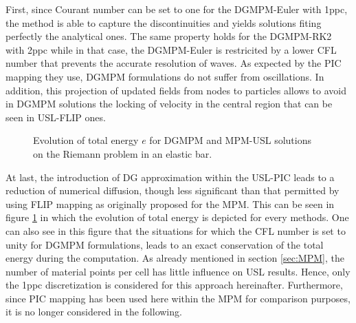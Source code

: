 First, since Courant number can be set to one for the DGMPM-Euler with 1ppc, the method is able to capture the discontinuities and yields solutions fiting perfectly the analytical ones. The same property holds for the DGMPM-RK2 with 2ppc while in that case, the DGMPM-Euler is restricited by a lower CFL number that prevents the accurate resolution of waves. As expected by the PIC mapping they use, DGMPM formulations do not suffer from oscillations. 
In addition, this projection of updated fields from nodes to particles allows to avoid in DGMPM solutions the locking of velocity in the central region that can be seen in USL-FLIP ones.
\begin{figure}[h!]
  \centering
  
  \caption{Evolution of total energy $e$ for DGMPM and MPM-USL solutions on the Riemann problem in an elastic bar.}
  \label{fig:energy_elastic_RP}
\end{figure}
At last, the introduction of DG approximation within the USL-PIC leads to a reduction of numerical diffusion, though less significant than that permitted by using FLIP mapping as originally proposed for the MPM. This can be seen in figure \ref{fig:energy_elastic_RP} in which the evolution of total energy is depicted for every methods.
One can also see in this figure that the situations for which the CFL number is set to unity for DGMPM formulations, leads to an exact conservation of the total energy during the computation.
As already mentioned in section \ref{sec:MPM}, the number of material points per cell has little influence on USL results. Hence, only the 1ppc discretization is considered for this approach hereinafter. Furthermore, since PIC mapping has been used here within the MPM for comparison purposes, it is no longer considered in the following.
